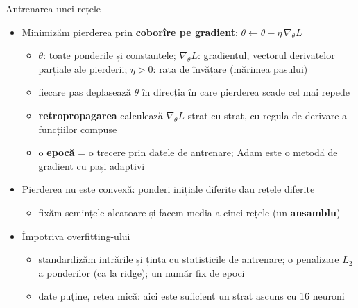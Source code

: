 \begin{frame}{Antrenarea unei rețele}
\itemsize{\small}
\begin{itemize}
    \item Minimizăm pierderea prin \textbf{coborîre pe gradient}: $\theta \leftarrow \theta - \eta\,\nabla_\theta L$
    \begin{itemize}
        \item $\theta$: toate ponderile și constantele; $\nabla_\theta L$: gradientul, vectorul derivatelor parțiale ale pierderii; $\eta > 0$: rata de învățare (mărimea pasului)
        \item fiecare pas deplasează $\theta$ în direcția în care pierderea scade cel mai repede
        \item \textbf{retropropagarea} calculează $\nabla_\theta L$ strat cu strat, cu regula de derivare a funcțiilor compuse 
        \item o \textbf{epocă} = o trecere prin datele de antrenare; Adam este o metodă de gradient cu pași adaptivi
    \end{itemize}
    \item Pierderea nu este convexă: ponderi inițiale diferite dau rețele diferite
    \begin{itemize}
        \item fixăm semințele aleatoare și facem media a cinci rețele (un \textbf{ansamblu})
    \end{itemize}
    \item Împotriva overfitting-ului
    \begin{itemize}
        \item standardizăm intrările și ținta cu statisticile de antrenare; o penalizare $L_2$ a ponderilor (ca la ridge); un număr fix de epoci
        \item date puține, rețea mică: aici este suficient un strat ascuns cu 16 neuroni
    \end{itemize}
\end{itemize}
\end{frame}

